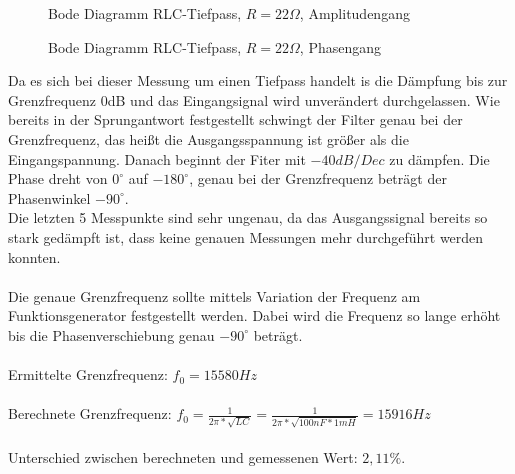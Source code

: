 \begin{figure}[H]
  \centering
  \caption{Bode Diagramm RLC-Tiefpass, $R=22\Omega$, Amplitudengang}
\end{figure}
\begin{figure}[H]
  \centering
  \caption{Bode Diagramm RLC-Tiefpass, $R=22\Omega$, Phasengang}
\end{figure}
\noindent
Da es sich bei dieser Messung um einen Tiefpass handelt is die D\"ampfung bis zur Grenzfrequenz 0dB und das Eingangsignal wird unver\"andert durchgelassen. Wie bereits in der Sprungantwort festgestellt schwingt der Filter genau bei der Grenzfrequenz, das heißt die Ausgangsspannung ist gr\"o\ss{}er als die Eingangspannung. Danach beginnt der Fiter mit $-40dB/Dec$ zu d\"ampfen. Die Phase dreht von $0^\circ$ auf $-180^\circ$, genau bei der Grenzfrequenz beträgt der Phasenwinkel $-90^\circ$. \\
Die letzten 5 Messpunkte sind sehr ungenau, da das Ausgangssignal bereits so stark ged\"ampft ist, dass keine genauen Messungen mehr durchgef\"uhrt werden konnten. \\ \\
Die genaue Grenzfrequenz sollte mittels Variation der Frequenz am Funktionsgenerator festgestellt werden. Dabei wird die Frequenz so lange erh\"oht bis die Phasenverschiebung genau $-90^\circ$ betr\"agt. \\ \\
Ermittelte Grenzfrequenz: $f_0=15580Hz$ \\ \\
Berechnete Grenzfrequenz: $f_0=\frac{1}{2\pi * \sqrt{LC}}=\frac{1}{2\pi * \sqrt{100nF*1mH}} = 15916Hz$ \\ \\
Unterschied zwischen berechneten und gemessenen Wert: $2,11\%$.


